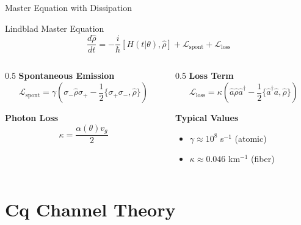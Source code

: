 \documentclass[10pt]{beamer}
\begin{document}
\begin{frame}{Master Equation with Dissipation}
\begin{block}{Lindblad Master Equation}
\begin{equation*}
\frac{d\hat{\rho}}{dt} = -\frac{i}{\hbar}[H(t|\theta), \hat{\rho}] + \mathcal{L}_{\text{spont}} + \mathcal{L}_{\text{loss}}
\end{equation*}
\end{block}

\begin{columns}
\begin{column}{0.5\textwidth}
\textbf{Spontaneous Emission}
\begin{equation*}
\mathcal{L}_{\text{spont}} = \gamma\left(\sigma_- \hat{\rho}\sigma_+ - \frac{1}{2}\{\sigma_+\sigma_-, \hat{\rho}\}\right)
\end{equation*}

\textbf{Photon Loss}
\begin{equation*}
\kappa = \frac{\alpha(\theta)v_g}{2}
\end{equation*}
\end{column}

\begin{column}{0.5\textwidth}
\textbf{Loss Term}
\begin{equation*}
\mathcal{L}_{\text{loss}} = \kappa\left(\hat{a}\hat{\rho}\hat{a}^\dagger - \frac{1}{2}\{\hat{a}^\dagger\hat{a}, \hat{\rho}\}\right)
\end{equation*}

\textbf{Typical Values}
\begin{itemize}
\item $\gamma \approx 10^8$ s$^{-1}$ (atomic)
\item $\kappa \approx 0.046$ km$^{-1}$ (fiber)
\end{itemize}
\end{column}
\end{columns}
\end{frame}

\section{Cq Channel Theory}
\end{document}
